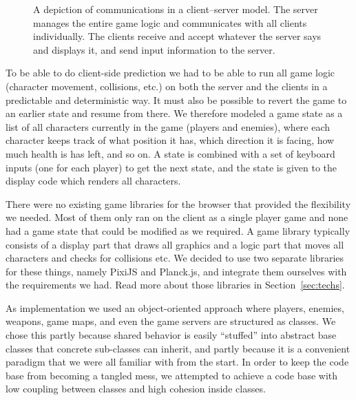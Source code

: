 \documentclass[a4paper]{article}
\begin{document}
\begin{figure}[!ht]
    \centering
    \caption{A depiction of communications in a client–server model. The server manages the entire game logic and communicates with all clients individually. The clients receive and accept  whatever the server says and displays it, and send input information to the server.}
    \label{fig:client-server}
\end{figure}

To be able to do client-side prediction we had to be able to run all game logic (character movement, collisions, etc.) on both the server and the clients in a predictable and deterministic way. It must also be possible to revert the game to an earlier state and resume from there. We therefore modeled a game state as a list of all characters currently in the game (players and enemies), where each character keeps track of what position it has, which direction it is facing, how much health is has left, and so on. A state is combined with a set of keyboard inputs (one for each player) to get the next state, and the state is given to the display code which renders all characters.

There were no existing game libraries for the browser that provided the flexibility we needed. Most of them only ran on the client as a single player game and none had a game state that could be modified as we required. A game library typically consists of a display part that draws all graphics and a logic part that moves all characters and checks for collisions etc. We decided to use two separate libraries for these things, namely PixiJS and Planck.js, and integrate them ourselves with the requirements we had. Read more about those libraries in Section~\ref{sec:techs}.

As implementation we used an object-oriented approach where players, enemies, weapons, game maps, and even the game servers are structured as classes. We chose this partly because shared behavior is easily ``stuffed'' into abstract base classes that concrete sub-classes can inherit, and partly because it is a convenient paradigm that we were all familiar with from the start. In order to keep the code base from becoming a tangled mess, we attempted to achieve a code base with low coupling between classes and high cohesion inside classes.
\end{document}
